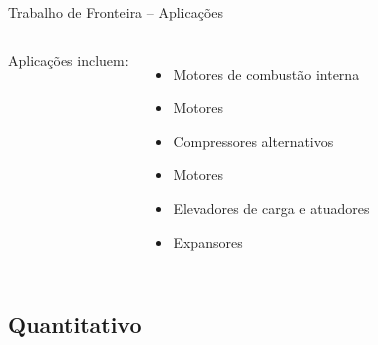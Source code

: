     \begin{frame}{Trabalho de Fronteira -- Aplicações}\vspace*{-2em}
        \begin{columns}
        Aplicações incluem:                                             \\[\medskipamount]
        \begin{itemize}
            \item Motores de combustão interna                          \\[\medskipamount]
            \item Motores \bf{}\rm     \\[\medskipamount]
            \item Compressores alternativos                             \\[\medskipamount]
            \item Motores \bf{}\rm     \\[\medskipamount]
            \item Elevadores de carga e atuadores                       \\[\medskipamount]
            \item Expansores \bf{}\rm
        \end{itemize}
        \end{columns}
    \end{frame}

\subsection{Quantitativo}

